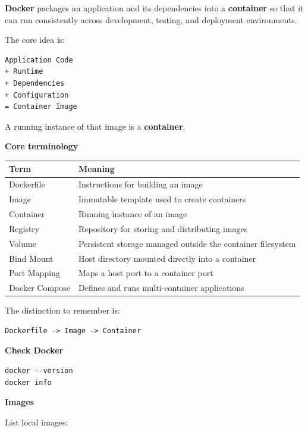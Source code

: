 \documentclass[11pt,letterpaper]{article}
\begin{document}
\textbf{Docker} packages an application and its dependencies into a
\textbf{container} so that it can run consistently across development,
testing, and deployment environments.

The core idea is:

\begin{lstlisting}
Application Code
+ Runtime
+ Dependencies
+ Configuration
= Container Image
\end{lstlisting}

A running instance of that image is a \textbf{container}.

\textbf{Core terminology}

\begin{center}
\begin{tabularx}{\textwidth}{lX}
\toprule
Term & Meaning \\
\midrule
Dockerfile & Instructions for building an image \\
Image & Immutable template used to create containers \\
Container & Running instance of an image \\
Registry & Repository for storing and distributing images \\
Volume & Persistent storage managed outside the container filesystem \\
Bind Mount & Host directory mounted directly into a container \\
Port Mapping & Maps a host port to a container port \\
Docker Compose & Defines and runs multi-container applications \\
\bottomrule
\end{tabularx}
\end{center}

The distinction to remember is:

\begin{lstlisting}
Dockerfile -> Image -> Container
\end{lstlisting}



\textbf{Check Docker}

\begin{lstlisting}
docker --version
docker info
\end{lstlisting}

\textbf{Images}

List local images:
\end{document}
